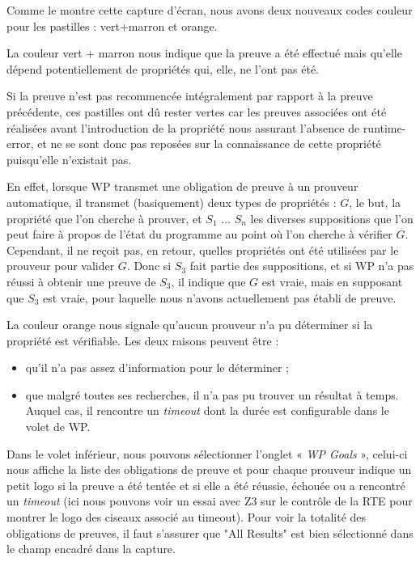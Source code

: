 Comme le montre cette capture d'écran, nous avons deux nouveaux codes couleur
pour les pastilles : vert+marron et orange.



La couleur vert + marron nous indique que la preuve a été effectué mais 
qu'elle dépend potentiellement de propriétés qui, elle, ne l'ont pas été.



Si  la preuve n'est pas recommencée intégralement par rapport à la preuve 
précédente, ces pastilles ont dû rester vertes car les preuves associées ont
été réalisées avant l'introduction de la propriété nous assurant l'absence 
de runtime-error, et ne se sont donc pas reposées sur la connaissance de cette
propriété puisqu'elle n'existait pas.



En effet, lorsque WP transmet une obligation de preuve à un prouveur automatique,
il transmet (basiquement) deux types de propriétés : $G$, le but, la propriété 
que l'on cherche à prouver, et $S_1$ ... $S_n$ les diverses suppositions que l'on
peut faire à propos de l'état du programme au point où l'on cherche à vérifier $G$.
Cependant, il ne reçoit pas, en retour, quelles propriétés ont été utilisées par
le prouveur pour valider $G$. Donc si $S_3$ fait partie des suppositions, et si
WP n'a pas réussi à obtenir une preuve de $S_3$, il indique que $G$ est vraie, mais
en supposant que $S_3$ est vraie, pour laquelle nous n'avons actuellement pas
établi de preuve.



La couleur orange nous signale qu'aucun prouveur n'a pu déterminer si la 
propriété est vérifiable. Les deux raisons peuvent être :



\begin{itemize}
\item qu'il n'a pas assez d'information pour le déterminer ;
\item que malgré toutes ses recherches, il n'a pas pu trouver un résultat à 
temps. Auquel cas, il rencontre un \textit{timeout} dont la durée est configurable 
dans le volet de WP.
\end{itemize}


Dans le volet inférieur, nous pouvons sélectionner l'onglet « \textit{WP Goals} », 
celui-ci nous affiche la liste des obligations de preuve et pour chaque 
prouveur indique un petit logo si la preuve a été tentée et si elle a été 
réussie, échouée ou a rencontré un \textit{timeout} (ici nous pouvons voir un essai 
avec Z3 sur le contrôle de la RTE pour montrer le logo des ciseaux 
associé au timeout). Pour voir la totalité des obligations de preuves, il
faut s'assurer que "All Results" est bien sélectionné dans le champ encadré
dans la capture.



